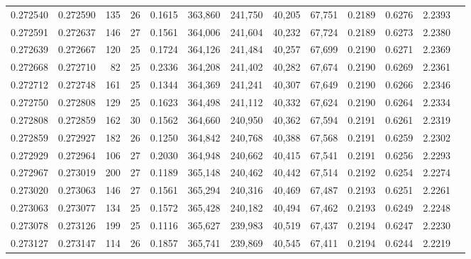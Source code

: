 \begin{tabular}{rrrrrrrrrrrrr}
0.272540 & 0.272590 &   135 &  26 &                                     0.1615 & 363,860 & 241,750 &  40,205 &  67,751 & 0.2189 & 0.6276 & 2.2393 \\
0.272591 & 0.272637 &   146 &  27 &                                     0.1561 & 364,006 & 241,604 &  40,232 &  67,724 & 0.2189 & 0.6273 & 2.2380 \\
0.272639 & 0.272667 &   120 &  25 &                                     0.1724 & 364,126 & 241,484 &  40,257 &  67,699 & 0.2190 & 0.6271 & 2.2369 \\
0.272668 & 0.272710 &    82 &  25 &                                     0.2336 & 364,208 & 241,402 &  40,282 &  67,674 & 0.2190 & 0.6269 & 2.2361 \\
0.272712 & 0.272748 &   161 &  25 &                                     0.1344 & 364,369 & 241,241 &  40,307 &  67,649 & 0.2190 & 0.6266 & 2.2346 \\
0.272750 & 0.272808 &   129 &  25 &                                     0.1623 & 364,498 & 241,112 &  40,332 &  67,624 & 0.2190 & 0.6264 & 2.2334 \\
0.272808 & 0.272859 &   162 &  30 &                                     0.1562 & 364,660 & 240,950 &  40,362 &  67,594 & 0.2191 & 0.6261 & 2.2319 \\
0.272859 & 0.272927 &   182 &  26 &                                     0.1250 & 364,842 & 240,768 &  40,388 &  67,568 & 0.2191 & 0.6259 & 2.2302 \\
0.272929 & 0.272964 &   106 &  27 &                                     0.2030 & 364,948 & 240,662 &  40,415 &  67,541 & 0.2191 & 0.6256 & 2.2293 \\
0.272967 & 0.273019 &   200 &  27 &                                     0.1189 & 365,148 & 240,462 &  40,442 &  67,514 & 0.2192 & 0.6254 & 2.2274 \\
0.273020 & 0.273063 &   146 &  27 &                                     0.1561 & 365,294 & 240,316 &  40,469 &  67,487 & 0.2193 & 0.6251 & 2.2261 \\
0.273063 & 0.273077 &   134 &  25 &                                     0.1572 & 365,428 & 240,182 &  40,494 &  67,462 & 0.2193 & 0.6249 & 2.2248 \\
0.273078 & 0.273126 &   199 &  25 &                                     0.1116 & 365,627 & 239,983 &  40,519 &  67,437 & 0.2194 & 0.6247 & 2.2230 \\
0.273127 & 0.273147 &   114 &  26 &                                     0.1857 & 365,741 & 239,869 &  40,545 &  67,411 & 0.2194 & 0.6244 & 2.2219 \\

\end{tabular}
